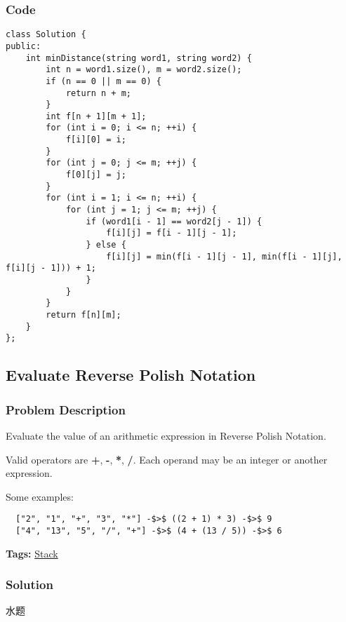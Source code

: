 \documentclass{article}
\begin{document}
\begin{CJK*}{UTF8}{gkai}
\subsubsection*{Code}
\begin{lstlisting}
class Solution {
public:
    int minDistance(string word1, string word2) {
        int n = word1.size(), m = word2.size();
        if (n == 0 || m == 0) {
            return n + m;
        }
        int f[n + 1][m + 1];
        for (int i = 0; i <= n; ++i) {
            f[i][0] = i;
        }
        for (int j = 0; j <= m; ++j) {
            f[0][j] = j;
        }
        for (int i = 1; i <= n; ++i) {
            for (int j = 1; j <= m; ++j) {
                if (word1[i - 1] == word2[j - 1]) {
                    f[i][j] = f[i - 1][j - 1];
                } else {
                    f[i][j] = min(f[i - 1][j - 1], min(f[i - 1][j], f[i][j - 1])) + 1;
                }
            }
        }
        return f[n][m];
    }
}; 
\end{lstlisting}


\subsection{ Evaluate Reverse Polish Notation }
\label{ Evaluate Reverse Polish Notation }

\subsubsection*{Problem Description}
Evaluate the value of an arithmetic expression in Reverse Polish Notation.

Valid operators are \textbf{+}, \textbf{-}, \textbf{*}, \textbf{/}. Each operand may be an integer or another expression.

Some examples:
\begin{verbatim}
  ["2", "1", "+", "3", "*"] -$>$ ((2 + 1) * 3) -$>$ 9
  ["4", "13", "5", "/", "+"] -$>$ (4 + (13 / 5)) -$>$ 6
\end{verbatim}


\textbf{Tags: }
\hyperref[ Stack ]{ Stack }



\subsubsection*{Solution}
水题


\end{CJK*}
\end{document}

